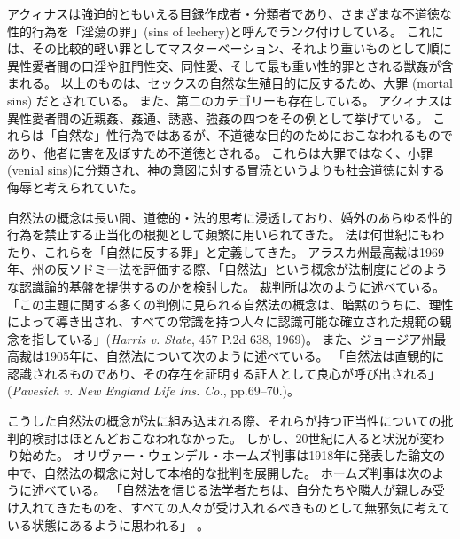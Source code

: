 \documentclass[paper=a4,book,openany]{jlreq}
\begin{document}
アクィナスは強迫的ともいえる目録作成者・分類者であり、さまざまな不道徳な性的行為を「淫蕩の罪」(sins of lechery)と呼んでランク付けしている。
これには、その比較的軽い罪としてマスターベーション、それより重いものとして順に異性愛者間の口淫や肛門性交、同性愛、そして最も重い性的罪とされる獣姦が含まれる。
以上のものは、セックスの自然な生殖目的に反するため、大罪 (mortal sins) だとされている。
また、第二のカテゴリーも存在している。
アクィナスは異性愛者間の近親姦、姦通、誘惑、強姦の四つをその例として挙げている。
これらは「自然な」性行為ではあるが、不道徳な目的のためにおこなわれるものであり、他者に害を及ぼすため不道徳とされる。
これらは大罪ではなく、小罪(venial sins)に分類され、神の意図に対する冒涜というよりも社会道徳に対する侮辱と考えられていた\citep[cf.][II.ii, Question 154]{aquinas20:_summa_theol}。

自然法の概念は長い間、道徳的・法的思考に浸透しており、婚外のあらゆる性的行為を禁止する正当化の根拠として頻繁に用いられてきた。
法は何世紀にもわたり、これらを「自然に反する罪」と定義してきた。
アラスカ州最高裁は1969年、州の反ソドミー法を評価する際、「自然法」という概念が法制度にどのような認識論的基盤を提供するのかを検討した。
裁判所は次のように述べている。
「この主題に関する多くの判例に見られる自然法の概念は、暗黙のうちに、理性によって導き出され、すべての常識を持つ人々に認識可能な確立された規範の観念を指している」(\emph{Harris v. State}, 457 P.2d 638, 1969)。
また、ジョージア州最高裁は1905年に、自然法について次のように述べている。
「自然法は直観的に認識されるものであり、その存在を証明する証人として良心が呼び出される」(\emph{Pavesich v. New England Life Ins. Co.}, pp.69--70.)。

こうした自然法の概念が法に組み込まれる際、それらが持つ正当性についての批判的検討はほとんどおこなわれなかった。
しかし、20世紀に入ると状況が変わり始めた。
オリヴァー・ウェンデル・ホームズ判事は1918年に発表した論文の中で、自然法の概念に対して本格的な批判を展開した。
ホームズ判事は次のように述べている。
「自然法を信じる法学者たちは、自分たちや隣人が親しみ受け入れてきたものを、すべての人々が受け入れるべきものとして無邪気に考えている状態にあるように思われる」\citep[p.40]{holmes18:_natur_law} 。
\end{document}
